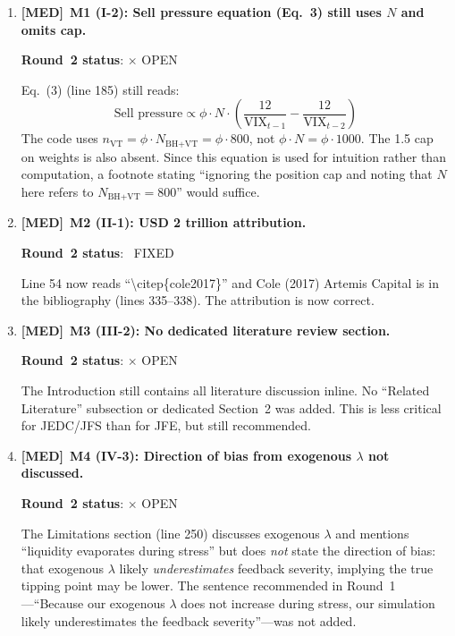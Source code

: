 \documentclass[12pt,a4paper]{article}
\newcommand{\MED}{\textbf{\textcolor{warncolor}{[MED]}}}
\newcommand{\FIXED}{\textcolor{okgreen}{\checkmark\ FIXED}}
\newcommand{\OPEN}{\textcolor{errorred}{$\times$ OPEN}}
\begin{document}
\begin{enumerate}

\item \MED\ \textbf{M1 (I-2): Sell pressure equation (Eq.~3) still uses $N$ and omits cap.}

\textbf{Round~2 status}: \OPEN

Eq.~(3) (line 185) still reads:
\[
\text{Sell pressure} \propto \phi \cdot N \cdot \left(\frac{12}{\text{VIX}_{t-1}} - \frac{12}{\text{VIX}_{t-2}}\right)
\]
The code uses $n_{\text{VT}} = \phi \cdot N_{\text{BH+VT}} = \phi \cdot 800$, not $\phi \cdot N = \phi \cdot 1000$. The 1.5 cap on weights is also absent. Since this equation is used for intuition rather than computation, a footnote stating ``ignoring the position cap and noting that $N$ here refers to $N_{\text{BH+VT}} = 800$'' would suffice.

\medskip

\item \MED\ \textbf{M2 (II-1): USD 2 trillion attribution.}

\textbf{Round~2 status}: \FIXED

Line 54 now reads ``\textbackslash citep\{cole2017\}'' and Cole (2017) Artemis Capital is in the bibliography (lines 335--338). The attribution is now correct.

\medskip

\item \MED\ \textbf{M3 (III-2): No dedicated literature review section.}

\textbf{Round~2 status}: \OPEN

The Introduction still contains all literature discussion inline. No ``Related Literature'' subsection or dedicated Section~2 was added. This is less critical for JEDC/JFS than for JFE, but still recommended.

\medskip

\item \MED\ \textbf{M4 (IV-3): Direction of bias from exogenous $\lambda$ not discussed.}

\textbf{Round~2 status}: \OPEN

The Limitations section (line 250) discusses exogenous $\lambda$ and mentions ``liquidity evaporates during stress'' but does \emph{not} state the direction of bias: that exogenous $\lambda$ likely \emph{underestimates} feedback severity, implying the true tipping point may be lower. The sentence recommended in Round~1---``Because our exogenous $\lambda$ does not increase during stress, our simulation likely underestimates the feedback severity''---was not added.


\end{enumerate}
\end{document}
